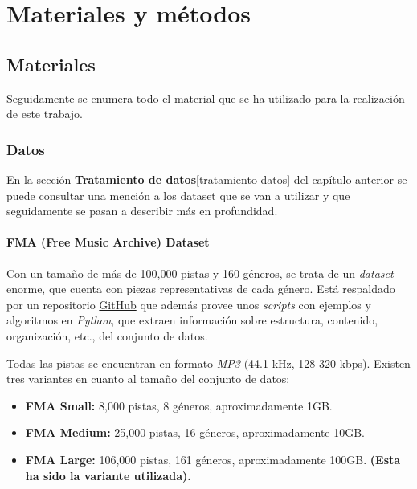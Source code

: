 
\cleardoublepage

\chapter{Materiales y métodos}

\section{Materiales}
Seguidamente se enumera todo el material que se ha utilizado para la realización de este trabajo.

\subsection{Datos}
\label{materiales-datos}

En la sección \textbf{Tratamiento de datos}\ref{tratamiento-datos} del capítulo anterior se puede consultar una mención a los dataset que se van a utilizar y que seguidamente se pasan a describir más en profundidad.

\subsubsection{FMA (Free Music Archive) Dataset}

Con un tamaño de más de 100,000 pistas y 160 géneros, se trata de un \emph{dataset} enorme, que cuenta con piezas representativas de cada género. Está respaldado por un repositorio \href{https://github.com/mdeff/fma}{GitHub} que además provee unos \emph{scripts} con ejemplos y algoritmos en \emph{Python}, que extraen información sobre estructura, contenido, organización, etc., del conjunto de datos.

Todas las pistas se encuentran en formato \emph{MP3} (44.1 kHz, 128-320 kbps). Existen tres variantes en cuanto al tamaño del conjunto de datos:

\begin{itemize}
    \item \textbf{FMA Small:} 8,000 pistas, 8 géneros, aproximadamente 1GB.
    \item \textbf{FMA Medium:} 25,000 pistas, 16 géneros, aproximadamente 10GB.
    \item \textbf{FMA Large:} 106,000 pistas, 161 géneros, aproximadamente 100GB. \textbf{(Esta ha sido la variante utilizada).}
\end{itemize}


